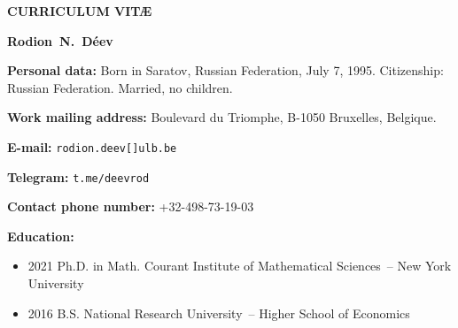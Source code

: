 \documentclass{article}
\begin{document}
\centerline{\bf\large CURRICULUM VIT\AE}

\vspace{3mm}

\centerline{\bf Rodion~N.~D\'eev}

\begin{description}

\vspace{1mm}

\item {\bf Personal data:}  Born in Saratov, Russian Federation, July 7, 1995. 
Citizenship: Russian Federation. Married,  no children.
\vspace{1mm}

\item {\bf Work mailing address:} Boulevard du Triomphe, B-1050 Bruxelles, Belgique.
\vspace{1mm}


\item {\bf E-mail:} {\tt rodion.deev[]ulb.be}
\vspace{1mm}

\item {\bf Telegram:} {\tt t.me/deevrod}
\vspace{1mm}

\item {\bf Contact phone number:} +32-498-73-19-03
\vspace{1mm}

\item {\bf Education:} \begin{itemize}
     \item 2021 \hspace{2mm} Ph.D. in Math. \hspace{2mm} Courant
     Institute of Mathematical Sciences~-- New York University
     \item 2016 \hspace{2mm} B.S. \hspace{2mm} National Research
     University~-- Higher School of Economics
\end{itemize}
\vspace{1mm}


\end{description}
\end{document}
